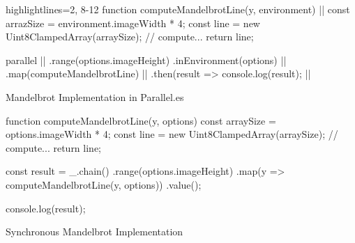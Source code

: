 \begin{listing}
	\begin{javascriptcode*}{highlightlines={2, 8-12}}
function computeMandelbrotLine(y, environment) { |$\label{code:parallel-es-operation}$|
	const arrazSize = environment.imageWidth * 4;
	const line = new Uint8ClampedArray(arraySize);
	// compute...
	return line;
}

parallel      |$\label{code:parallel-es-definition-start}$|
	.range(options.imageHeight)
	.inEnvironment(options) |$\label{code:parallel-es-in-environment}$|
	.map(computeMandelbrotLine) |$\label{code:parallel-es-map}$|
	.then(result => console.log(result); |$\label{code:parallel-es-start}$|
	\end{javascriptcode*}
	
	\caption{Mandelbrot Implementation in Parallel.es}
	\label{code:mandelbrot-parallel.es}
\end{listing}


\begin{listing}
	
	\begin{javascriptcode}
function computeMandelbrotLine(y, options) {
	const arraySize = options.imageWidth * 4;
	const line = new Uint8ClampedArray(arraySize);
	// compute...
	return line;
}

const result = _.chain()
	.range(options.imageHeight)
	.map(y => computeMandelbrotLine(y, options))
	.value();
	
console.log(result);
\end{javascriptcode}
\caption{Synchronous Mandelbrot Implementation}
\label{fig:mandelbrot-sync}
\end{listing}